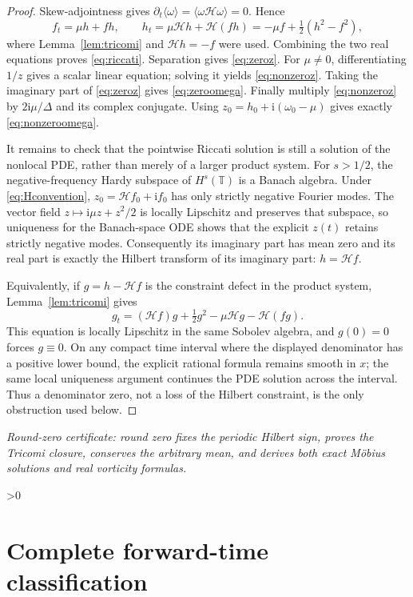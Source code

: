 \documentclass[10pt]{article}
\newcommand{\TT}{\mathbb T}
\newcommand{\ii}{\mathrm i}
\newcommand{\HH}{\mathcal H}
\newcommand{\mean}[1]{\langle #1\rangle}
\begin{document}
\begin{proof}
Skew-adjointness gives
$\partial_t\mean{\omega}=\mean{\omega\HH\omega}=0$.  Hence
\[
 f_t=\mu h+fh,\qquad
 h_t=\mu\HH h+\HH(fh)=-\mu f+\tfrac12(h^2-f^2),
\]
where Lemma~\ref{lem:tricomi} and $\HH h=-f$ were used.  Combining the two
real equations proves \eqref{eq:riccati}.  Separation gives
\eqref{eq:zeroz}.  For $\mu\ne0$, differentiating $1/z$ gives a scalar
linear equation; solving it yields \eqref{eq:nonzeroz}.
Taking the imaginary part of \eqref{eq:zeroz} gives
\eqref{eq:zeroomega}.  Finally multiply \eqref{eq:nonzeroz} by
$2\ii\mu/\Delta$ and its complex conjugate.  Using
$z_0=h_0+\ii(\omega_0-\mu)$ gives exactly
\eqref{eq:nonzeroomega}.

It remains to check that the pointwise Riccati solution is still a solution
of the nonlocal PDE, rather than merely of a larger product system.  For
$s>1/2$, the negative-frequency Hardy subspace of $H^s(\TT)$ is a Banach
algebra.  Under \eqref{eq:Hconvention},
$z_0=\HH f_0+\ii f_0$ has only strictly negative Fourier modes.  The vector
field $z\mapsto\ii\mu z+z^2/2$ is locally Lipschitz and preserves that
subspace, so uniqueness for the Banach-space ODE shows that the explicit
$z(t)$ retains strictly negative modes.  Consequently its imaginary part
has mean zero and its real part is exactly the Hilbert transform of its
imaginary part: $h=\HH f$.

Equivalently, if $g=h-\HH f$ is the constraint defect in the product
system, Lemma~\ref{lem:tricomi} gives
\[
 g_t=(\HH f)g+\tfrac12g^2-\mu\HH g-\HH(fg).
\]
This equation is locally Lipschitz in the same Sobolev algebra, and
$g(0)=0$ forces $g\equiv0$.  On any compact time interval where the
displayed denominator has a positive lower bound, the explicit rational
formula remains smooth in $x$; the same local uniqueness argument continues
the PDE solution across the interval.  Thus a denominator zero, not a loss
of the Hilbert constraint, is the only obstruction used below.
\end{proof}

\noindent\textit{Round-zero certificate: round zero fixes the periodic
Hilbert sign, proves the Tricomi closure, conserves the arbitrary mean, and
derives both exact M\"obius solutions and real vorticity formulas.}

\ifnum\CRevisionRound>0
\section{Complete forward-time classification}
\end{document}
